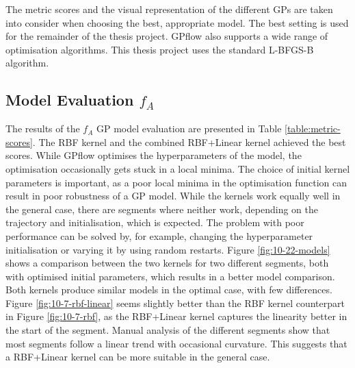 The metric scores and the visual representation of the different GPs are taken into consider when choosing the best, appropriate model.
The best setting is used for the remainder of the thesis project.
GPflow also supports a wide range of optimisation algorithms.
This thesis project uses the standard L-BFGS-B algorithm.

\subsection{Model Evaluation $f_A$}
The results of the $f_A$ GP model evaluation are presented in Table \ref{table:metric-scores}.
The RBF kernel and the combined RBF+Linear kernel achieved the best scores.
While GPflow optimises the hyperparameters of the model, the optimisation occasionally gets stuck in a local minima.
The choice of initial kernel parameters is important, as a poor local minima in the optimisation function can result in poor robustness of a GP model.
While the kernels work equally well in the general case, there are segments where neither work, depending on the trajectory and initialisation, which is expected.
The problem with poor performance can be solved by, for example, changing the hyperparameter initialisation or varying it by using random restarts.
Figure \ref{fig:10-22-models} shows a comparison between the two kernels for two different segments, both with optimised initial parameters, which results in a better model comparison.
Both kernels produce similar models in the optimal case, with few differences.
Figure \ref{fig:10-7-rbf-linear} seems slightly better than the RBF kernel counterpart in Figure \ref{fig:10-7-rbf}, as the RBF+Linear kernel captures the linearity better in the start of the segment.
Manual analysis of the different segments show that most segments follow a linear trend with occasional curvature.
This suggests that a RBF+Linear kernel can be more suitable in the general case. 


